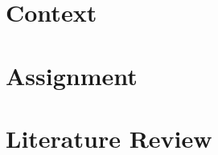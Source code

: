 \documentclass[conference]{IEEEtran}
\begin{document}















%
\section{Context}

%
\section{Assignment}

%
\section{Literature Review}

%
\end{document}
